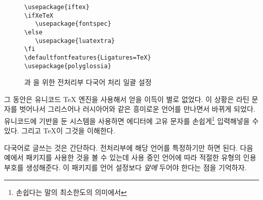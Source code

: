 \begin{figure}[!tp]
\begin{lined}{10cm}
\begin{verbatim}
\usepackage{iftex}
\ifXeTeX
   \usepackage{fontspec}
\else
   \usepackage{luatextra}
\fi
\defaultfontfeatures{Ligatures=TeX}
\usepackage{polyglossia}
\end{verbatim}
\end{lined}
\caption[전처리부의 설정]{과 을 위한 전처리부 다국어 처리 일괄 설정} \label{allinone}
\end{figure}

그 동안은 유니코드 \TeX{} 엔진을 사용해서 얻을 이득이 별로 없었다. 이 상황은 라틴 문자를 벗어나서 
그리스어나 러시아어와 같은 흥미로운 언어를 만나면서 바뀌게 되었다.
유니코드에 기반을 둔 시스템을 사용하면 에디터에 고유 문자를 손쉽게\footnote{손쉽다는 말의 최소한도의 의미에서} 입력해넣을 
수 있다. 그리고 \TeX 이 그것을 이해한다.

다국어로 글쓰는 것은 간단하다. 전처리부에 해당 언어를 특정하기만 하면 된다. 다음 예에서  패키지를
사용한 것을 볼 수 있는데 사용 중인 언어에 따라 적절한 유형의 인용부호를 생성해준다.
이 패키지를 언어 설정보다 \emph{앞에} 두어야 한다는 점을 기억하자.

